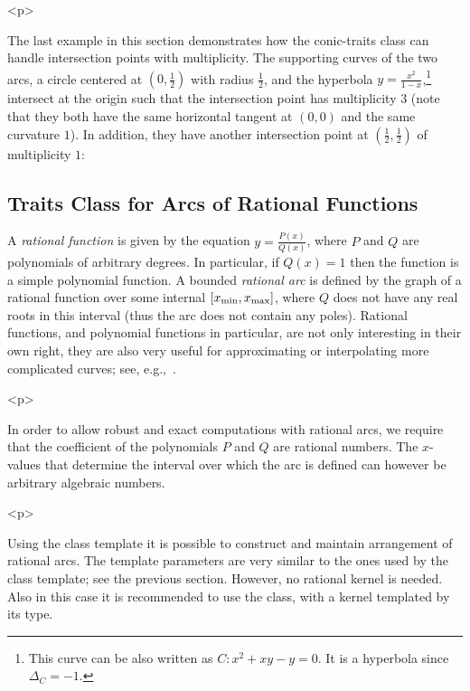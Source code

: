 
\begin{ccHtmlOnly}<p>\end{ccHtmlOnly}
The last example in this section demonstrates how the conic-traits
class can handle intersection points with multiplicity. The
supporting curves of the two arcs, a circle centered at
$(0,\frac{1}{2})$ with radius $\frac{1}{2}$, and the hyperbola $y
= \frac{x^2}{1-x}$,\footnote{This curve can be also written as $C:
x^2 + xy - y = 0$. It is a hyperbola since $\Delta_{C} = -1$.}
intersect at the origin such that the intersection point has
multiplicity $3$ (note that they both have the same horizontal
tangent at $(0,0)$ and the same curvature $1$). In addition, they
have another intersection point at $(\frac{1}{2},\frac{1}{2})$ of
multiplicity $1$:


\subsection{Traits Class for Arcs of Rational Functions}
\label{arr_ssec:tr_ratfunc}
%
A {\em rational function} is given by the equation $y =
\frac{P(x)}{Q(x)}$, where $P$ and $Q$ are polynomials of arbitrary
degrees. In particular, if $Q(x) = 1$ then the function is a
simple polynomial function. A bounded {\em rational arc} is
defined by the graph of a rational function over some internal
$[x_{\rm min}, x_{\rm max}]$, where $Q$ does not have any real
roots in this interval (thus the arc does not contain any poles).
Rational functions, and polynomial functions in particular, are
not only interesting in their own right, they are also very useful
for approximating or interpolating more complicated curves; see,
e.g.,~\cite[Chapter~3]{cgal:ptvf-nrcpp-02}.

\begin{ccHtmlOnly}<p>\end{ccHtmlOnly}
In order to allow robust and exact computations with rational
arcs, we require that the coefficient of the polynomials $P$ and
$Q$ are rational numbers. The $x$-values that determine the
interval over which the arc is defined can however be arbitrary
algebraic numbers.

\begin{ccHtmlOnly}<p>\end{ccHtmlOnly}
Using the  class
template it is possible to construct and maintain arrangement of
rational arcs. The template parameters are very similar to the
ones used by the  class template; see
the previous section. However, no rational kernel is needed. Also
in this case it is recommended to use the
 class, with a kernel templated
by its  type.

